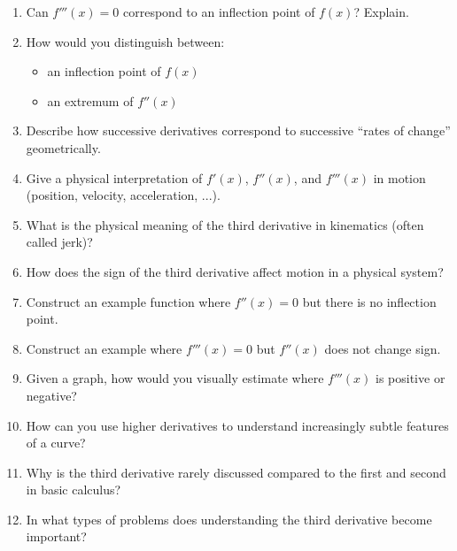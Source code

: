 \begin{enumerate}
  \item Can \(f'''(x)=0\) correspond to an inflection point of \(f(x)\)? Explain.
  \item How would you distinguish between:
    \begin{itemize}
      \item an inflection point of \(f(x)\)
      \item an extremum of \(f''(x)\)
    \end{itemize}
  \item Describe how successive derivatives correspond to successive “rates of change” geometrically.
  \item Give a physical interpretation of \(f'(x)\), \(f''(x)\), and \(f'''(x)\) in motion (position, velocity, acceleration, ...).
  \item What is the physical meaning of the third derivative in kinematics (often called jerk)?
  \item How does the sign of the third derivative affect motion in a physical system?
  \item Construct an example function where \(f''(x)=0\) but there is no inflection point.
  \item Construct an example where \(f'''(x)=0\) but \(f''(x)\) does not change sign.
  \item Given a graph, how would you visually estimate where \(f'''(x)\) is positive or negative?
  \item How can you use higher derivatives to understand increasingly subtle features of a curve?
  \item Why is the third derivative rarely discussed compared to the first and second in basic calculus?
  \item In what types of problems does understanding the third derivative become important?
\end{enumerate}
